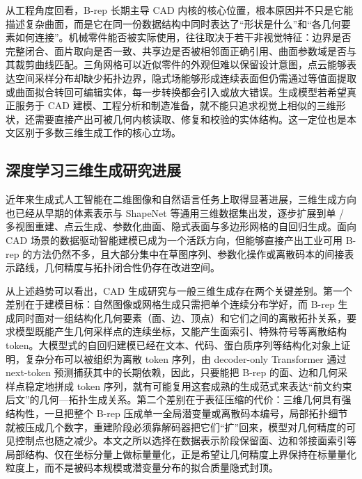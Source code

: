 从工程角度回看，B-rep 长期主导 CAD 内核的核心位置，根本原因并不只是它能描述复杂曲面，而是它在同一份数据结构中同时表达了“形状是什么”和“各几何要素如何连接”。机械零件能否被实际使用，往往取决于若干非视觉特征：边界是否完整闭合、面片取向是否一致、共享边是否被相邻面正确引用、曲面参数域是否与其裁剪曲线匹配。三角网格可以近似零件的外观但难以保留设计意图，点云能够表达空间采样分布却缺少拓扑边界，隐式场能够形成连续表面但仍需通过等值面提取或曲面拟合转回可编辑实体，每一步转换都会引入或放大错误。生成模型若希望真正服务于 CAD 建模、工程分析和制造准备，就不能只追求视觉上相似的三维形状，还需要直接产出可被几何内核读取、修复和校验的实体结构。这一定位也是本文区别于多数三维生成工作的核心立场。


\subsection{深度学习三维生成研究进展}

近年来生成式人工智能在二维图像和自然语言任务上取得显著进展，三维生成方向也已经从早期的体素表示与 ShapeNet 等通用三维数据集出发，逐步扩展到单 / 多视图重建、点云生成、参数化曲面、隐式表面与多边形网格的自回归生成\cite{wu_2015_3dshapenets,chang_2015_shapenet,choy_2016_3dr2n2,fan_2017_pointset,qi_2017_pointnet,qi_2017_pointnetplusplus,groueix_2018_atlasnet,achlioptas_2018_learning_representations,park_2019_deepsdf,mescheder_2019_occupancy,yang_2019_pointflow,nash_2020_polygen}。面向 CAD 场景的数据驱动智能建模已成为一个活跃方向\cite{tan_2026_intelligent_cad_review}，但能够直接产出工业可用 B-rep 的方法仍然不多，且大部分集中在草图序列、参数化操作或离散码本的间接表示路线，几何精度与拓扑闭合性仍存在改进空间。

从上述趋势可以看出，CAD 生成研究与一般三维生成存在两个关键差别。第一个差别在于建模目标：自然图像或网格生成只需把单个连续分布学好，而 B-rep 生成同时面对一组结构化几何要素（面、边、顶点）和它们之间的离散拓扑关系，要求模型既能产生几何采样点的连续坐标，又能产生面索引、特殊符号等离散结构 token。大模型式的自回归建模已经在文本、代码、蛋白质序列等结构化对象上证明，复杂分布可以被组织为离散 token 序列，由 decoder-only Transformer 通过 next-token 预测捕获其中的长期依赖，因此，只要能把 B-rep 的面、边和几何采样点稳定地拼成 token 序列，就有可能复用这套成熟的生成范式来表达“前文约束后文”的几何—拓扑生成关系。第二个差别在于表征压缩的代价：三维几何具有强结构性，一旦把整个 B-rep 压成单一全局潜变量或离散码本编号，局部拓扑细节就被压成几个数字，重建阶段必须靠解码器把它们“扩”回来，模型对几何精度的可见控制点也随之减少。本文之所以选择在数据表示阶段保留面、边和邻接面索引等局部结构、仅在坐标分量上做标量量化，正是希望让几何精度上界保持在标量量化粒度上，而不是被码本规模或潜变量分布的拟合质量隐式封顶。



